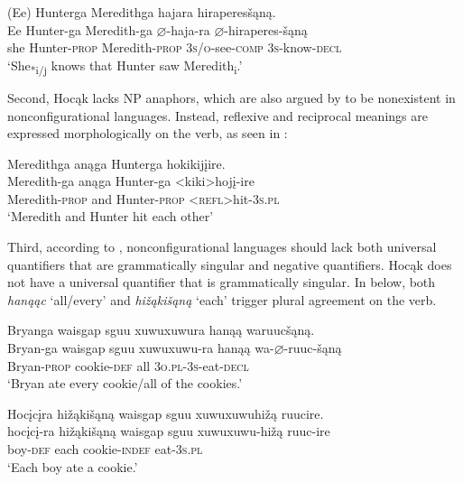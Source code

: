 \documentclass[output=paper]{LSP/langsci}
\begin{document}
\begin{exe}
\ex\label{ex:jrs:17}	
\glll (Ee) 	Hunterga 	Meredithga		hajara 						hiraperes\v{s}ąną. \\
 Ee 		Hunter-ga 	Meredith-ga 		$\varnothing$-haja-ra 				$\varnothing$-hiraperes-\v{s}ąną \\
she 		Hunter-\textsc{prop} 	Meredith-\textsc{prop} 	\textsc{3s/o}-see-\textsc{comp} 	\textsc{3s}-know-\textsc{decl}  \\
\trans `She\textsubscript{*i/j} knows that Hunter saw Meredith\textsubscript{i}.'
\end{exe}	

Second, Hocąk lacks NP anaphors, which are also argued by \citet{Baker1996} to be nonexistent in nonconfigurational languages. Instead, reflexive and reciprocal meanings are expressed morphologically on the verb, as seen in :

\begin{exe}
\ex\label{ex:jrs:18} 
\glll Meredithga		anąga 	Hunterga 			hokikij\k{i}ire.\\
Meredith-ga	 	anąga 	Hunter-ga 			<kiki>hoj\k{i}-ire \\
Meredith-\textsc{prop} and 		Hunter-\textsc{prop} 	<\textsc{refl}>hit-\textsc{3s.pl} \\
\trans `Meredith and Hunter hit each other'
\end{exe}
	
Third, according to \citet{Baker1996}, nonconfigurational languages should lack both universal quantifiers that are grammatically singular and negative quantifiers. Hocąk does not have a universal quantifier that is grammatically singular.  In  below, both \textit{hanąąc} `all/every' and \textit{hi\v{z}ąki\v{s}ąną} `each' trigger plural agreement on the verb.

\begin{exe}
\ex\label{ex:jrs:19}	
\begin{xlist}	
\ex
\glll Bryanga {waisgap sguu xuwuxuwura} 	hanąą 	waruuc\v{s}ąną.\\
Bryan-ga 	{waisgap sguu xuwuxuwu-ra} 	hanąą 	wa-$\varnothing$-ruuc-\v{s}ąną \\
	Bryan-\textsc{prop} 	cookie-\textsc{def}	all 		\textsc{3o.pl-3s}-eat-\textsc{decl} \\
\trans `Bryan ate every cookie/all of the cookies.'

\ex 
\glll Hoc\k{i}c\k{i}ra 	hi\v{z}ąki\v{s}ąną 	{waisgap sguu xuwuxuwuhi\v{z}ą }		ruucire.\\
hoc\k{i}c\k{i}-ra 	hi\v{z}ąki\v{s}ąną 	{waisgap sguu xuwuxuwu-hi\v{z}ą }		ruuc-ire \\
	boy-\textsc{def} 		each 					cookie-\textsc{indef}		eat-\textsc{3s.pl}\\
\trans `Each boy ate a cookie.'
\end{xlist}
\end{exe}
\end{document}
